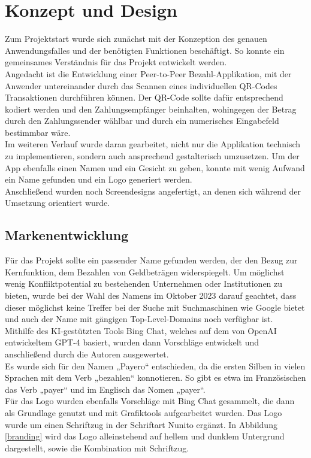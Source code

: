 
\chapter{Konzept und Design}

Zum Projektstart wurde sich zunächst mit der Konzeption des genauen Anwendungsfalles und der benötigten Funktionen beschäftigt.
So konnte ein gemeinsames Verständnis für das Projekt entwickelt werden.
\\
Angedacht ist die Entwicklung einer Peer-to-Peer Bezahl-Applikation, mit der Anwender untereinander durch das Scannen eines individuellen QR-Codes Transaktionen durchführen können.
Der QR-Code sollte dafür entsprechend kodiert werden und den Zahlungsempfänger beinhalten, wohingegen der Betrag durch den Zahlungssender wählbar und durch ein numerisches Eingabefeld bestimmbar wäre.
\\
Im weiteren Verlauf wurde daran gearbeitet, nicht nur die Applikation technisch zu implementieren, sondern auch ansprechend gestalterisch umzusetzen. Um der App ebenfalls einen Namen und ein Gesicht zu geben, konnte mit wenig Aufwand ein Name gefunden und ein Logo generiert werden.
\\
Anschließend wurden noch Screendesigns angefertigt, an denen sich während der Umsetzung orientiert wurde. 

\section{Markenentwicklung}

Für das Projekt sollte ein passender Name gefunden werden, der den Bezug zur Kernfunktion, dem Bezahlen von Geldbeträgen widerspiegelt.
Um möglichst wenig Konfliktpotential zu bestehenden Unternehmen oder Institutionen zu bieten, wurde bei der Wahl des Namens im Oktober 2023 darauf geachtet, dass dieser möglichst keine Treffer bei der Suche mit Suchmaschinen wie Google bietet und auch der Name mit gängigen Top-Level-Domains noch verfügbar ist.  
\\
Mithilfe des KI-gestützten Tools Bing Chat, welches auf dem von OpenAI entwickeltem GPT-4 basiert, wurden dann Vorschläge entwickelt und anschließend durch die Autoren ausgewertet.
\\
Es wurde sich für den Namen „Payero“ entschieden, da die ersten Silben in vielen Sprachen mit dem Verb „bezahlen“ konnotieren.
So gibt es etwa im Französischen das Verb „payer“ und im Englisch das Nomen „payer“.
\\
Für das Logo wurden ebenfalls Vorschläge mit Bing Chat gesammelt, die dann als Grundlage genutzt und mit Grafiktools aufgearbeitet wurden.
Das Logo wurde um einen Schriftzug in der Schriftart Nunito ergänzt.
In Abbildung \ref{branding} wird das Logo alleinstehend auf hellem und dunklem Untergrund dargestellt, sowie die Kombination mit Schriftzug.

